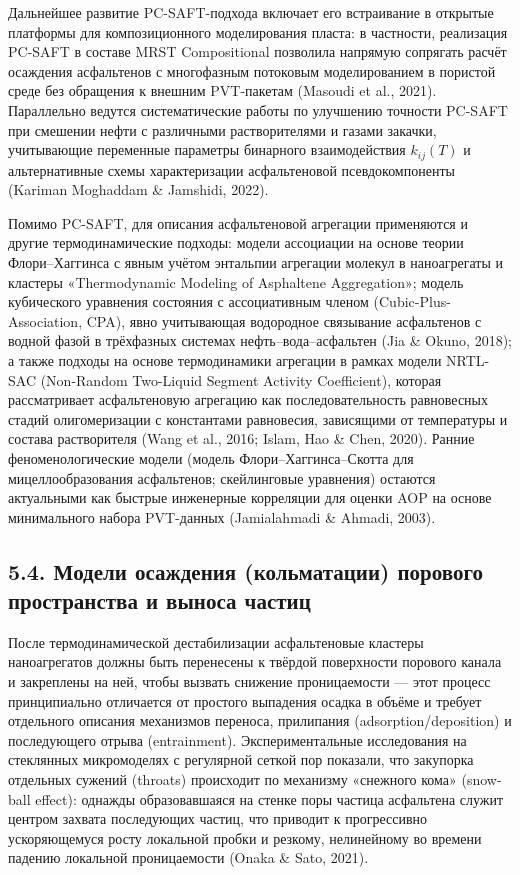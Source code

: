 \documentclass[11pt]{extarticle}
\begin{document}
Дальнейшее развитие PC-SAFT-подхода включает его встраивание в открытые платформы для композиционного моделирования пласта: в частности, реализация PC-SAFT в составе MRST Compositional позволила напрямую сопрягать расчёт осаждения асфальтенов с многофазным потоковым моделированием в пористой среде без обращения к внешним PVT-пакетам (Masoudi et al., 2021). Параллельно ведутся систематические работы по улучшению точности PC-SAFT при смешении нефти с различными растворителями и газами закачки, учитывающие переменные параметры бинарного взаимодействия \(k_{ij}(T)\) и альтернативные схемы характеризации асфальтеновой псевдокомпоненты (Kariman Moghaddam \& Jamshidi, 2022).

Помимо PC-SAFT, для описания асфальтеновой агрегации применяются и другие термодинамические подходы: модели ассоциации на основе теории Флори--Хаггинса с явным учётом энтальпии агрегации молекул в наноагрегаты и кластеры «Thermodynamic Modeling of Asphaltene Aggregation»; модель кубического уравнения состояния с ассоциативным членом (Cubic-Plus-Association, CPA), явно учитывающая водородное связывание асфальтенов с водной фазой в трёхфазных системах нефть--вода--асфальтен (Jia \& Okuno, 2018); а также подходы на основе термодинамики агрегации в рамках модели NRTL-SAC (Non-Random Two-Liquid Segment Activity Coefficient), которая рассматривает асфальтеновую агрегацию как последовательность равновесных стадий олигомеризации с константами равновесия, зависящими от температуры и состава растворителя (Wang et al., 2016; Islam, Hao \& Chen, 2020). Ранние феноменологические модели (модель Флори--Хаггинса--Скотта для мицеллообразования асфальтенов; скейлинговые уравнения) остаются актуальными как быстрые инженерные корреляции для оценки AOP на основе минимального набора PVT-данных (Jamialahmadi \& Ahmadi, 2003).

\subsection{5.4. Модели осаждения (кольматации) порового пространства и выноса частиц}\label{ux43cux43eux434ux435ux43bux438-ux43eux441ux430ux436ux434ux435ux43dux438ux44f-ux43aux43eux43bux44cux43cux430ux442ux430ux446ux438ux438-ux43fux43eux440ux43eux432ux43eux433ux43e-ux43fux440ux43eux441ux442ux440ux430ux43dux441ux442ux432ux430-ux438-ux432ux44bux43dux43eux441ux430-ux447ux430ux441ux442ux438ux446}

После термодинамической дестабилизации асфальтеновые кластеры наноагрегатов должны быть перенесены к твёрдой поверхности порового канала и закреплены на ней, чтобы вызвать снижение проницаемости --- этот процесс принципиально отличается от простого выпадения осадка в объёме и требует отдельного описания механизмов переноса, прилипания (adsorption/deposition) и последующего отрыва (entrainment). Экспериментальные исследования на стеклянных микромоделях с регулярной сеткой пор показали, что закупорка отдельных сужений (throats) происходит по механизму «снежного кома» (snow-ball effect): однажды образовавшаяся на стенке поры частица асфальтена служит центром захвата последующих частиц, что приводит к прогрессивно ускоряющемуся росту локальной пробки и резкому, нелинейному во времени падению локальной проницаемости (Onaka \& Sato, 2021).
\end{document}
